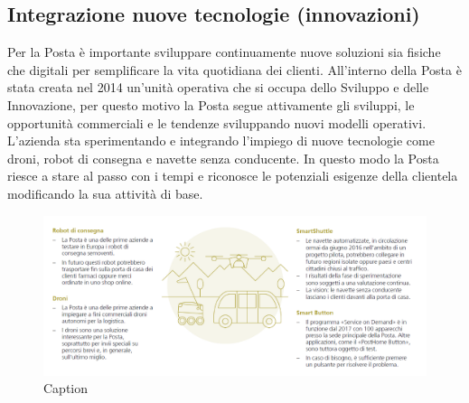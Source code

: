 \subsection{Integrazione nuove tecnologie (innovazioni)}
Per la Posta è importante sviluppare continuamente nuove soluzioni sia fisiche che digitali per semplificare la vita quotidiana dei clienti. All’interno della Posta è stata creata nel 2014 un’unità operativa che si occupa dello Sviluppo e delle Innovazione, per questo motivo la Posta segue attivamente gli sviluppi, le opportunità commerciali e le tendenze sviluppando nuovi modelli operativi. L’azienda sta sperimentando e integrando l’impiego di nuove tecnologie come droni, robot di consegna e navette senza conducente. In questo modo la Posta riesce a stare al passo con i tempi e riconosce le potenziali esigenze della clientela modificando la sua attività di base.
\begin{figure}
    \centering
    \includegraphics{sviluppi.PNG}
    \caption{Caption}
    \label{fig:my_label}
\end{figure}

